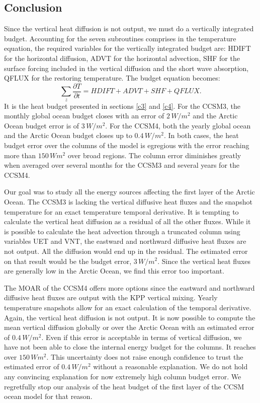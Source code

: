 \subsection{Conclusion}\label{concEB}

Since the vertical heat diffusion is not output, we must do a vertically integrated budget. Accounting for the seven subroutines comprises in the temperature equation, the required variables for the vertically integrated budget are: HDIFT for the horizontal diffusion, ADVT for the horizontal advection, SHF for the surface forcing included in the vertical diffusion and the short wave absorption, QFLUX for the restoring temperature. The budget equation becomes:
\begin{equation}
\sum_z \frac{\partial T}{\partial t} = HDIFT+ADVT+SHF+QFLUX.
\end{equation}
It is the heat budget presented in sections \ref{c3} and \ref{c4}. For the CCSM3, the monthly global ocean budget closes with an error of $2\,W/m^2$ and the Arctic Ocean budget error is of $3\,W/m^2$. For the CCSM4, both the yearly global ocean and the Arctic Ocean budget closes up to $0.4\,W/m^2$. In both cases, the heat budget error over the columns of the model is egregious with the error reaching more than $150\,Wm^2$ over broad regions. The column error diminishes greatly when averaged over several months for the CCSM3 and several years for the CCSM4. 

Our goal was to study all the energy sources affecting the first layer of the Arctic Ocean. The CCSM3 is lacking the vertical diffusive heat fluxes and the snapshot temperature for an exact temperature temporal derivative. It is tempting to calculate the vertical heat diffusion as a residual of all the other fluxes. While it is possible to calculate the heat advection through a truncated column using variables UET and VNT, the eastward and northward diffusive heat fluxes are not output. All the diffusion would end up in the residual. The estimated error on that result would be the budget error, $3\,W/m^2$. Since the vertical heat fluxes are generally low in the Arctic Ocean, we find this error too important. 

The MOAR of the CCSM4 offers more options since the eastward and northward diffusive heat fluxes are output with the KPP vertical mixing. Yearly temperature snapshots allow for an exact calculation of the temporal derivative. Again, the vertical heat diffusion is not output. It is now possible to compute the mean vertical diffusion globally or over the Arctic Ocean with an estimated error of $0.4\,W/m^2$. Even if this error is acceptable in terms of vertical diffusion, we have not been able to close the internal energy budget for the columns. It reaches over $150\,Wm^2$. This uncertainty does not raise enough confidence to trust the estimated error of $0.4\,W/m^2$ without a reasonable explanation. We do not hold any convincing explanation for now extremely high column budget error. We regretfully stop our analysis of the heat budget of the first layer of the CCSM ocean model for that reason. 



